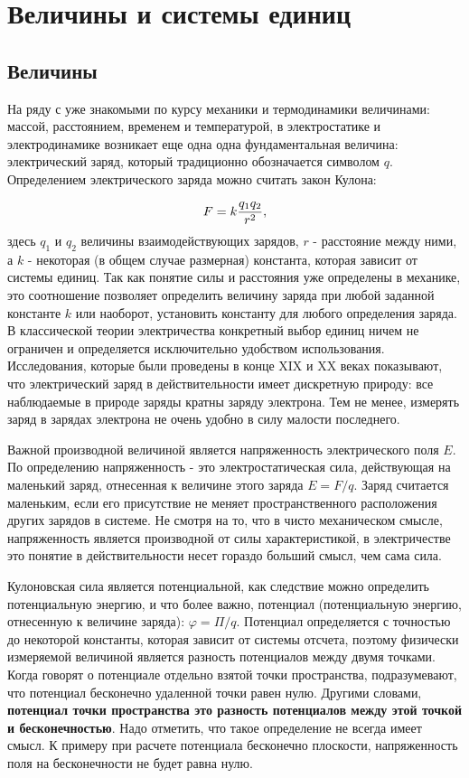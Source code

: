 \section{Величины и системы единиц}

\subsection{Величины}

На ряду с уже знакомыми по курсу механики и термодинамики величинами: массой, расстоянием, временем и температурой, в электростатике и электродинамике возникает еще одна одна фундаментальная величина: электрический заряд, который традиционно обозначается символом $q$. Определением электрического заряда можно считать закон Кулона:

\begin{equation}
	\eqmark
	F = k \frac{q_1 q_2}{r^2},
\end{equation}
здесь $q_1$ и $q_2$ величины взаимодействующих зарядов, $r$ - расстояние между ними, а $k$ - некоторая (в общем случае размерная) константа, которая зависит от системы единиц. Так как понятие силы и расстояния уже определены в механике, это соотношение позволяет определить величину заряда при любой заданной константе $k$ или наоборот, установить константу для любого определения заряда. В классической теории электричества конкретный выбор единиц ничем не ограничен и определяется исключительно удобством использования. Исследования, которые были проведены в конце XIX и XX веках показывают, что электрический заряд в действительности имеет дискретную природу: все наблюдаемые в природе заряды кратны заряду электрона. Тем не менее, измерять заряд в зарядах электрона не очень удобно в силу малости последнего.

Важной производной величиной является напряженность электрического поля $E$. По определению напряженность - это электростатическая сила, действующая на маленький заряд, отнесенная к величине этого заряда $E = F/q$. Заряд считается маленьким, если его присутствие не меняет пространственного расположения других зарядов в системе. Не смотря на то, что в чисто механическом смысле, напряженность является производной от силы характеристикой, в электричестве это понятие в действительности несет гораздо больший смысл, чем сама сила.

Кулоновская сила является потенциальной, как следствие можно определить потенциальную энергию, и что более важно, потенциал (потенциальную энергию, отнесенную к величине заряда): $\varphi = \Pi/q$. Потенциал определяется с точностью до некоторой константы, которая зависит от системы отсчета, поэтому физически измеряемой величиной является разность потенциалов между двумя точками. Когда говорят о потенциале отдельно взятой точки пространства, подразумевают, что потенциал бесконечно удаленной точки равен нулю. Другими словами, \textbf{потенциал точки пространства это разность потенциалов между этой точкой и бесконечностью}. Надо отметить, что такое определение не всегда имеет смысл. К примеру при расчете потенциала бесконечно плоскости, напряженность поля на бесконечности не будет равна нулю.

